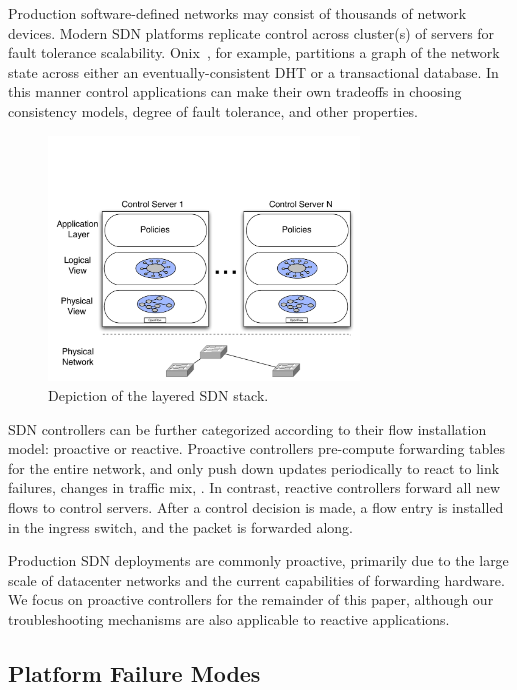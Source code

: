 Production software-defined networks may consist of thousands of network
devices. Modern SDN platforms replicate control across cluster(s) of servers
for fault tolerance scalability.
Onix~\cite{onix}, for example,
partitions a graph of the network state across either an eventually-consistent
DHT or a transactional database. In this manner control applications can make their own
tradeoffs in choosing consistency models, degree of
fault tolerance, and other properties.

\begin{figure}[t]
    \includegraphics[width=3.25in]{../diagrams/architecture/SDN_Stack.pdf}
    \caption[]{\label{fig:basicarch} Depiction of the layered SDN stack.} 
\end{figure}

SDN controllers can be further categorized according to their flow
installation model: proactive or reactive.
Proactive controllers pre-compute forwarding tables for the entire network,
and only push down updates periodically to react to link failures, changes in
traffic mix, \etc. In contrast, reactive controllers forward all new flows to
control servers. After a control decision is made, a flow entry is installed
in the ingress switch, and the packet is forwarded along.

Production SDN deployments are commonly proactive, primarily due to the large
scale of datacenter networks and the current capabilities of forwarding hardware.
We focus on proactive controllers for the remainder of this paper,
although our troubleshooting mechanisms are also applicable to reactive
applications.

\subsection{Platform Failure Modes}

